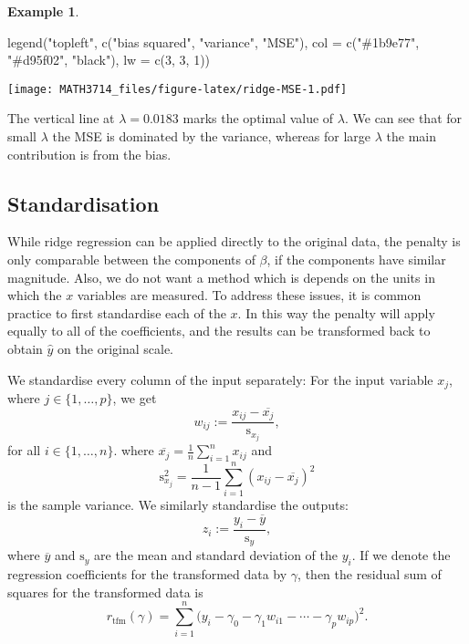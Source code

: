\documentclass[
  a4paper,
]{article}
\newenvironment{Shaded}{\begin{snugshade}}{\end{snugshade}}
\newcommand{\AttributeTok}[1]{\textcolor[rgb]{0.77,0.63,0.00}{#1}}
\newcommand{\DecValTok}[1]{\textcolor[rgb]{0.00,0.00,0.81}{#1}}
\newcommand{\FunctionTok}[1]{\textcolor[rgb]{0.00,0.00,0.00}{#1}}
\newcommand{\NormalTok}[1]{#1}
\newcommand{\StringTok}[1]{\textcolor[rgb]{0.31,0.60,0.02}{#1}}
\theoremstyle{definition}
\theoremstyle{definition}
\newtheorem{example}{Example}[section]
\theoremstyle{definition}
\theoremstyle{definition}
\theoremstyle{remark}
\begin{document}
\begin{example}
\begin{Shaded}
\begin{Highlighting}[]
\FunctionTok{legend}\NormalTok{(}\StringTok{"topleft"}\NormalTok{,}
       \FunctionTok{c}\NormalTok{(}\StringTok{"bias squared"}\NormalTok{, }\StringTok{"variance"}\NormalTok{, }\StringTok{"MSE"}\NormalTok{),}
       \AttributeTok{col =} \FunctionTok{c}\NormalTok{(}\StringTok{"\#1b9e77"}\NormalTok{, }\StringTok{"\#d95f02"}\NormalTok{, }\StringTok{"black"}\NormalTok{),}
       \AttributeTok{lw =} \FunctionTok{c}\NormalTok{(}\DecValTok{3}\NormalTok{, }\DecValTok{3}\NormalTok{, }\DecValTok{1}\NormalTok{))}
\end{Highlighting}
\end{Shaded}

\texttt{[image: MATH3714\_files/figure-latex/ridge-MSE-1.pdf]}

The vertical line at \(\lambda = 0.0183\)
marks the optimal value of \(\lambda\). We can see that for small \(\lambda\) the
MSE is dominated by the variance, whereas for large \(\lambda\) the main
contribution is from the bias.
\end{example}

\hypertarget{standardisation}{%
\subsection{Standardisation}\label{standardisation}}

While ridge regression can be applied directly to the original data, the
penalty is only comparable between the components of \(\beta\), if the components
have similar magnitude. Also, we do not want a method which is depends on the
units in which the \(x\) variables are measured. To address these issues, it is
common practice to first standardise each of the \(x\). In this way the
penalty will apply equally to all of the coefficients, and the results can be
transformed back to obtain \(\hat{y}\) on the original scale.

We standardise every column of the input separately: For
the input variable \(x_j\), where \(j\in\{1, \ldots, p\}\), we get
\begin{equation*}
  w_{ij}
  := \frac{x_{ij} - \overline{x_j}}{\mathrm{s}_{x_j}},
\end{equation*}
for all \(i \in \{1, \ldots, n\}\).
where \(\overline{x_j} = \frac1n \sum_{i=1}^n x_{ij}\) and
\begin{equation*}
  \mathrm{s}_{x_j}^2
  = \frac{1}{n-1} \sum_{i=1}^n (x_{ij} - \overline{x_j})^2
\end{equation*}
is the sample variance. We similarly standardise the outputs:
\begin{equation*}
  z_i
  := \frac{y_i - \overline{y}}{\mathrm{s}_y},
\end{equation*}
where \(\overline{y}\) and \(\mathrm{s}_y\) are the mean and standard
deviation of the \(y_i\). If we denote the regression coefficients
for the transformed data by \(\gamma\), then the residual sum of
squares for the transformed data is
\begin{equation*}
  r_\mathrm{tfm}(\gamma)
  = \sum_{i=1}^n \bigl(y_i - \gamma_0 - \gamma_1 w_{i1} - \cdots - \gamma_p w_{ip} \bigr)^2.
\end{equation*}
\end{document}
